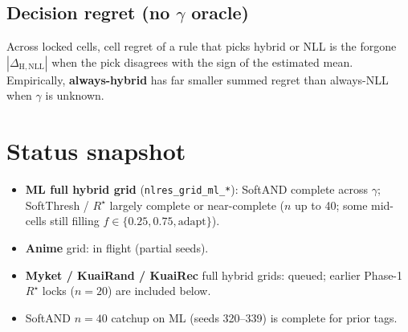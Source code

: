 \documentclass[10pt,a4paper]{article}
\begin{document}
\subsection{Decision regret (no $\gamma$ oracle)}
Across locked cells, cell regret of a rule that picks hybrid or NLL is the
forgone $|\Delta_{\mathrm{H},\mathrm{NLL}}|$ when the pick disagrees with the sign of
the estimated mean. Empirically, \textbf{always-hybrid} has far smaller summed
regret than always-NLL when $\gamma$ is unknown.

\newpage
\section{Status snapshot}
\begin{itemize}[leftmargin=1.2em]
\item \textbf{ML full hybrid grid} (\texttt{nlres\_grid\_ml\_*}): SoftAND complete
  across $\gamma$; SoftThresh / $R^\star$ largely complete or near-complete ($n$ up to 40;
  some mid-cells still filling $f\in\{0.25,0.75,\mathrm{adapt}\}$).
\item \textbf{Anime} grid: in flight (partial seeds).
\item \textbf{Myket / KuaiRand / KuaiRec} full hybrid grids: queued; earlier Phase-1
  $R^\star$ locks ($n{=}20$) are included below.
\item SoftAND $n{=}40$ catchup on ML (seeds 320--339) is complete for prior tags.
\end{itemize}
\end{document}
